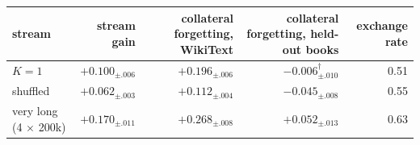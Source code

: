 \begin{tabular}{lrrrr}
\toprule
stream & stream gain & collateral forgetting, WikiText & collateral forgetting, held-out books & exchange rate \\
\midrule
$K=1$ & $+0.100_{\pm .006}$ & $+0.196_{\pm .006}$ & $-0.006_{\pm .010}^{\dagger}$ & 0.51 \\
shuffled & $+0.062_{\pm .003}$ & $+0.112_{\pm .004}$ & $-0.045_{\pm .008}$ & 0.55 \\
very long (4 $\times$ 200k) & $+0.170_{\pm .011}$ & $+0.268_{\pm .008}$ & $+0.052_{\pm .013}$ & 0.63 \\
\bottomrule
\end{tabular}
